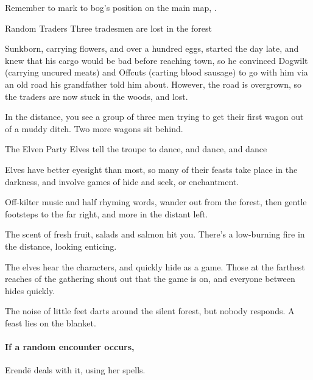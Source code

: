 Remember to mark to bog's position on the main map, .

{Random Traders}%
{Three tradesmen are lost in the forest}%

Sunkborn, carrying flowers, and over a hundred eggs, started the day late, and knew that his cargo would be bad before reaching \gls{town}, so he convinced Dogwilt (carrying uncured meats) and Offcuts (carting blood sausage) to go with him via an old road his grandfather told him about.
However, the road is overgrown, so the traders are now stuck in the woods, and lost.

\begin{boxtext}
  In the distance, you see a group of three men trying to get their first wagon out of a muddy ditch.
  Two more wagons sit behind.
\end{boxtext}



{The Elven Party}%
{Elves tell the troupe to dance, and dance, and dance}%

Elves have better eyesight than most, so many of their feasts take place in the darkness, and involve games of hide and seek, or enchantment.

\begin{boxtext}
  Off-kilter music and half rhyming words, wander out from the forest, then gentle footsteps to the far right, and more in the distant left.

  The scent of fresh fruit, salads and salmon hit you.  There's a low-burning fire in the distance, looking enticing.
\end{boxtext}

The elves hear the characters, and quickly hide as a game.  Those at the farthest reaches of the gathering shout out that the game is on, and everyone between hides quickly.

\begin{boxtext}
  The noise of little feet darts around the silent forest, but nobody responds.
  A feast lies on the blanket.
\end{boxtext}

\paragraph{If a random encounter occurs,}
Erend\"e deals with it, using her spells.


